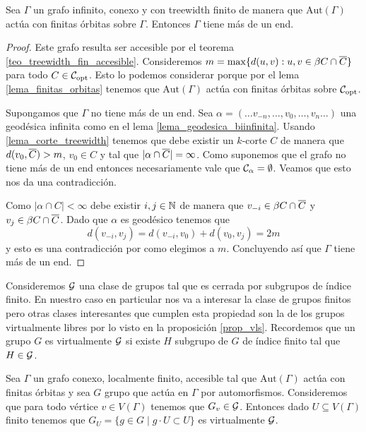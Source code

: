 \documentclass[tesis.tex]{subfiles}
\newcommand{\aut}{\text{Aut}}
\begin{document}
\begin{lema}\label{lema_tw_mas_1_end}
	Sea $\Gamma$ un grafo infinito, conexo y con treewidth finito de manera que $\aut(\Gamma)$ actúa con finitas órbitas sobre $\Gamma$.
	Entonces $\Gamma$ tiene más de un end.
\end{lema}
\begin{proof}
	Este grafo resulta ser accesible por el teorema \ref{teo_treewidth_fin_accesible}.
	Consideremos $m = \max \{  d(u,v) : u,v \in \beta C \cap \overline C \}$ para todo $C \in {\cal C}_{\text{opt}}$.
	Esto lo podemos considerar porque por el lema \ref{lema_finitas_orbitas} tenemos que $\aut(\Gamma)$ actúa con finitas órbitas sobre ${\cal C}_{\text{opt}}$.
	
	Supongamos que $\Gamma$ no tiene más de un end.
	Sea $\alpha = (\dots v_{-n}, \dots, v_{0}, \dots, v_{n} \dots)$ una geodésica infinita como en el lema \ref{lema_geodesica_biinfinita}.
	Usando \ref{lema_corte_treewidth} tenemos que debe existir un $k$-corte $C$ de manera que $d(v_{0}, \overline C) > m$, $v_{0} \in C$ y tal que $|\alpha \cap \overline C|=\infty$.
	Como suponemos que el grafo no tiene más de un end entonces necesariamente vale que ${\cal{C}}_{\alpha} = \emptyset$. 
	Veamos que esto nos da una contradicción.
	
	Como $|\alpha \cap C| < \infty$ debe existir $i,j \in \mathbb{N}$ de manera que $v_{-i} \in \beta C \cap \overline C$ y $v_{j} \in \beta C \cap \overline C$.
	Dado que $\alpha$ es geodésico tenemos que
	\[
		d(v_{-i},v_{j}) = d(v_{-i},v_{0}) + d(v_{0}, v_{j}) = 2m
	\]
	y esto es una contradicción por como elegimos a $m$. 
	Concluyendo así que $\Gamma$ tiene más de un end.
	
\end{proof}

Consideremos ${\cal G}$ una clase de grupos tal que es cerrada por subgrupos de índice finito.
En nuestro caso en particular nos va a interesar la clase de grupos finitos pero otras clases interesantes que cumplen esta propiedad son la de los grupos virtualmente libres por lo visto en la proposición \ref{prop_vls}.
Recordemos que un grupo $G$ es virtualmente ${\cal G}$ si existe $H$ subgrupo de $G$ de índice finito tal que $H \in {\cal G}$.

\begin{lema}\label{lema_accion_virtualmente_g}
	Sea $\Gamma$ un grafo conexo, localmente finito, accesible tal que $\aut(\Gamma)$ actúa con finitas órbitas y sea $G$ grupo que actúa en $\Gamma$ por automorfismos.
	Consideremos que para todo vértice $v \in V(\Gamma)$ tenemos que $G_{v} \in {\cal G}$.
	Entonces dado $U \subseteq V(\Gamma)$ finito tenemos que $G_{U} = \{ g \in G \mid g \cdot { U} \subset { U} \}$ es virtualmente ${\cal G}$.
\end{lema}
\end{document}
